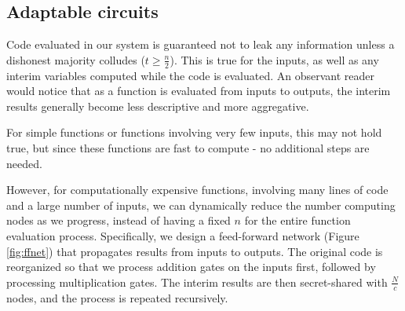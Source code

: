 \documentclass{article} \usepackage{nips13submit_e,times}
\begin{document}
\subsection{Adaptable circuits}

Code evaluated in our system is guaranteed not to leak any information unless a dishonest majority colludes ($t \geq \frac{n}{2}$). This is true for the inputs, as well as any interim variables computed while the code is evaluated. An observant reader would notice that as a function is evaluated from inputs to outputs, the interim results generally become less descriptive and more aggregative.

For simple functions or functions involving very few inputs, this may not hold true, but since these functions are fast to compute - no additional steps are needed.

However, for computationally expensive functions, involving many lines of code and a large number of inputs, we can dynamically reduce the number computing nodes as we progress, instead of having a fixed $n$ for the entire function evaluation process. Specifically, we design a feed-forward network (Figure \ref{fig:ffnet}) that propagates results from inputs to outputs. The original code is reorganized so that we process addition gates on the inputs first, followed by processing multiplication gates. The interim results are then secret-shared with $\frac{N}{c}$ nodes, and the process is repeated recursively.
\end{document}
